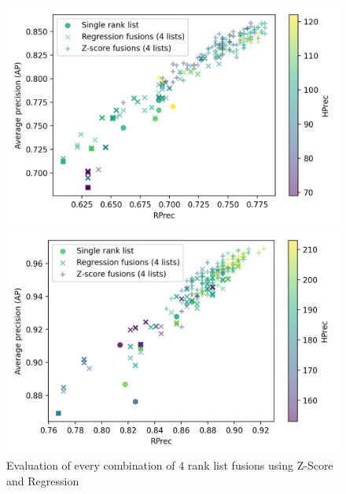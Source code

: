 \begin{figure}
  \centering
  \caption{Evaluation of every combination of 4 rank list fusions using Z-Score and Regression}
  \label{fig:fusions}

  \label{fig:fusion_evaluation_A}
  \includegraphics[width=\linewidth]{img/fusion_evaluation_A.png}

  \label{fig:fusion_evaluation_B}
  \includegraphics[width=\linewidth]{img/fusion_evaluation_B.png}
\end{figure}

